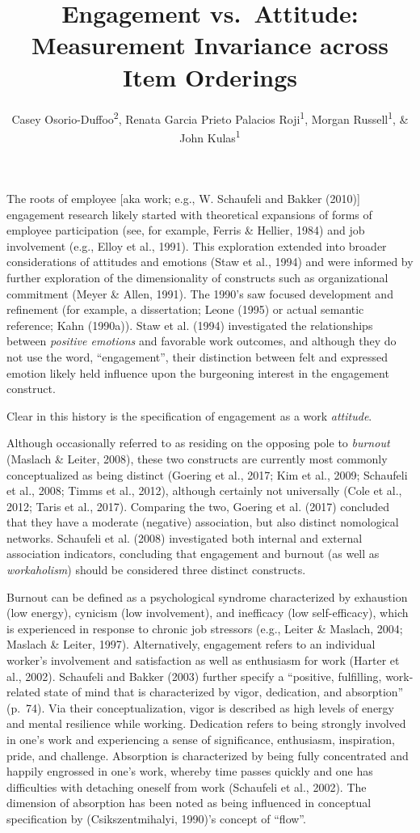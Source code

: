 \documentclass[
  man]{apa7}
\title{Engagement vs.~Attitude: Measurement Invariance across Item Orderings}
\author{Casey Osorio-Duffoo\textsuperscript{2}, Renata Garcia Prieto Palacios Roji\textsuperscript{1}, Morgan Russell\textsuperscript{1}, \& John Kulas\textsuperscript{1}}
\date{}
\affiliation{\vspace{0.5cm}\textsuperscript{1} Montclair State University\\\textsuperscript{2} Harver}
\begin{document}
\maketitle

The roots of employee {[}aka work; e.g., W. Schaufeli and Bakker (2010){]} engagement research likely started with theoretical expansions of forms of employee participation (see, for example, Ferris \& Hellier, 1984) and job involvement (e.g., Elloy et al., 1991). This exploration extended into broader considerations of attitudes and emotions (Staw et al., 1994) and were informed by further exploration of the dimensionality of constructs such as organizational commitment (Meyer \& Allen, 1991). The 1990's saw focused development and refinement (for example, a dissertation; Leone (1995) or actual semantic reference; Kahn (1990a)). Staw et al. (1994) investigated the relationships between \emph{positive emotions} and favorable work outcomes, and although they do not use the word, ``engagement'', their distinction between felt and expressed emotion likely held influence upon the burgeoning interest in the engagement construct.

Clear in this history is the specification of engagement as a work \emph{attitude}.

Although occasionally referred to as residing on the opposing pole to \emph{burnout} (Maslach \& Leiter, 2008), these two constructs are currently most commonly conceptualized as being distinct (Goering et al., 2017; Kim et al., 2009; Schaufeli et al., 2008; Timms et al., 2012), although certainly not universally (Cole et al., 2012; Taris et al., 2017). Comparing the two, Goering et al. (2017) concluded that they have a moderate (negative) association, but also distinct nomological networks. Schaufeli et al. (2008) investigated both internal and external association indicators, concluding that engagement and burnout (as well as \emph{workaholism}) should be considered three distinct constructs.

Burnout can be defined as a psychological syndrome characterized by exhaustion (low energy), cynicism (low involvement), and inefficacy (low self-efficacy), which is experienced in response to chronic job stressors (e.g., Leiter \& Maslach, 2004; Maslach \& Leiter, 1997). Alternatively, engagement refers to an individual worker's involvement and satisfaction as well as enthusiasm for work (Harter et al., 2002). Schaufeli and Bakker (2003) further specify a ``positive, fulfilling, work-related state of mind that is characterized by vigor, dedication, and absorption'' (p.~74). Via their conceptualization, vigor is described as high levels of energy and mental resilience while working. Dedication refers to being strongly involved in one's work and experiencing a sense of significance, enthusiasm, inspiration, pride, and challenge. Absorption is characterized by being fully concentrated and happily engrossed in one's work, whereby time passes quickly and one has difficulties with detaching oneself from work (Schaufeli et al., 2002). The dimension of absorption has been noted as being influenced in conceptual specification by (Csikszentmihalyi, 1990)'s concept of ``flow''.
\end{document}
